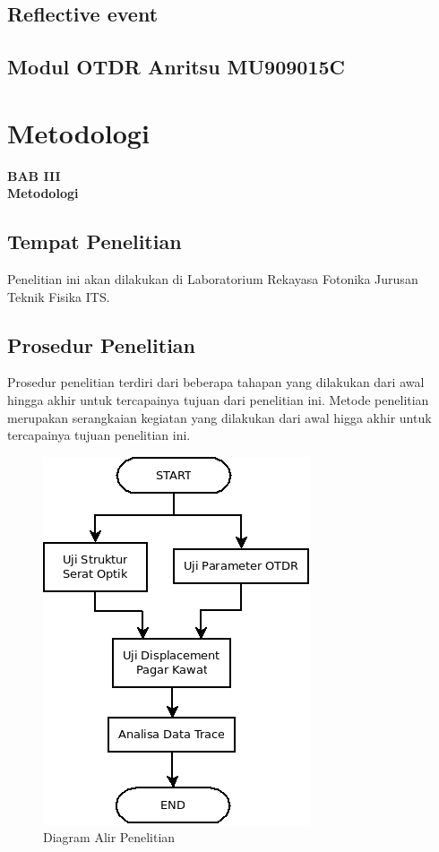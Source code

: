 \documentclass[12pt]{article}
\begin{document}
	\subsection{Reflective event}

	\subsection{Modul OTDR Anritsu MU909015C}
	



\newpage

	\setcounter{figure}{0}

	\section{Metodologi}
	
	\begin{center}
		{\large \textbf{BAB III}} \\
		{\large \textbf{Metodologi}}
	\end{center}
	
	\subsection{Tempat  Penelitian}
	
	Penelitian ini akan dilakukan di Laboratorium Rekayasa Fotonika Jurusan Teknik Fisika ITS.
	
	\subsection{Prosedur Penelitian}
	
	Prosedur penelitian terdiri dari beberapa tahapan yang dilakukan dari awal hingga akhir untuk tercapainya tujuan dari penelitian ini.
	Metode penelitian merupakan serangkaian kegiatan yang dilakukan dari awal higga akhir untuk tercapainya tujuan penelitian ini.
	
	\begin{figure}[!h]
		\centering
		\captionsetup{justification=centering}
		\includegraphics[width=0.4\linewidth]{images/Bab_3/Bab_3_1}
		\caption[Diagram Alir Penelitian]{\small{Diagram Alir Penelitian}}
	\end{figure}
\end{document}
